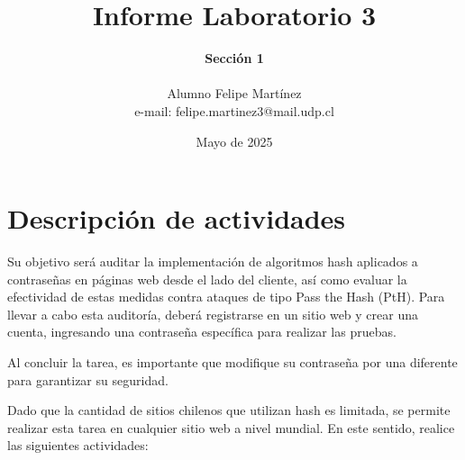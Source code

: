 \documentclass[letter,12pt]{article}
\begin{document}
%
   \title{\Huge{Informe Laboratorio 3}}

   \author{\textbf{Sección 1} \\  \\Alumno Felipe Martínez \\ e-mail: felipe.martinez3@mail.udp.cl}
          
   \date{Mayo de 2025}

   \maketitle
   
   \tableofcontents
 
  \newpage
  

\section{Descripción de actividades}
Su objetivo será auditar la implementación de algoritmos hash aplicados a contraseñas en páginas web desde el lado del cliente, así como evaluar la efectividad de estas medidas contra ataques de tipo Pass the Hash (PtH). Para llevar a cabo esta auditoría, deberá registrarse en un sitio web y crear una cuenta, ingresando una contraseña específica para realizar las pruebas.\par

Al concluir la tarea, es importante que modifique su contraseña por una diferente para garantizar su seguridad.\par

Dado que la cantidad de sitios chilenos que utilizan hash es limitada, se permite realizar esta tarea en cualquier sitio web a nivel mundial. En este sentido, realice las siguientes actividades:
\end{document}
